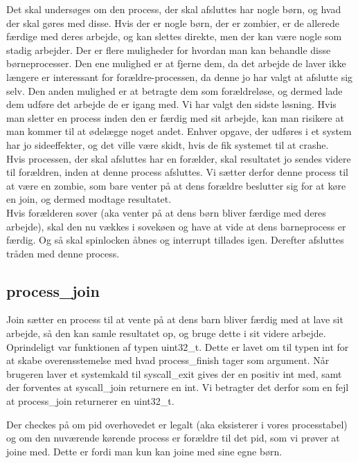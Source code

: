 \documentclass[10pt,a4paper,danish]{article}
\begin{document}
Det skal undersøges om den process, der skal afsluttes har nogle børn, og hvad der skal gøres med disse. Hvis der er nogle børn, der er zombier, er de allerede færdige med deres arbejde, og kan slettes direkte, men der kan være nogle som stadig arbejder. Der er flere muligheder for hvordan man kan behandle disse børneprocesser. Den ene mulighed er at fjerne dem, da det arbejde de laver ikke længere er interessant for forældre-processen, da denne jo har valgt at afslutte sig selv. Den anden mulighed er at betragte dem som forældreløse, og dermed lade dem udføre det arbejde de er igang med. Vi har valgt den sidste løsning. Hvis man sletter en process inden den er færdig med sit arbejde, kan man risikere at man kommer til at ødelægge noget andet. Enhver opgave, der udføres i et system har jo sideeffekter, og det ville være skidt, hvis de fik systemet til at crashe.\\

Hvis processen, der skal afsluttes har en forælder, skal resultatet jo sendes videre til forældren, inden at denne process afsluttes. Vi sætter derfor denne process til at være en zombie, som bare venter på at dens forældre beslutter sig for at køre en join, og dermed modtage resultatet. \\

Hvis forælderen sover (aka venter på at dens børn bliver færdige med deres arbejde), skal den nu vækkes i sovekøen og have at vide at dens barneprocess er færdig. Og så skal spinlocken åbnes og interrupt tillades igen. Derefter afsluttes tråden med denne process.

\subsection{process\_join}
Join sætter en process til at vente på at dens barn bliver færdig med at lave sit arbejde, så den kan samle resultatet op, og bruge dette i sit videre arbejde. Oprindeligt var funktionen af typen uint32\_t.
Dette er lavet om til typen int for at skabe overensstemelse med hvad process\_finish tager som argument. Når brugeren laver et systemkald til syscall\_exit gives der en positiv int med, samt der forventes at syscall\_join returnere en int. Vi betragter det derfor som en fejl at process\_join returnerer en uint32\_t.


Der checkes på om pid overhovedet er legalt (aka eksisterer i vores processtabel) og om den nuværende kørende process er forældre til det pid, som vi prøver at joine med. Dette er fordi man kun kan joine med sine egne børn.\\
\end{document}
